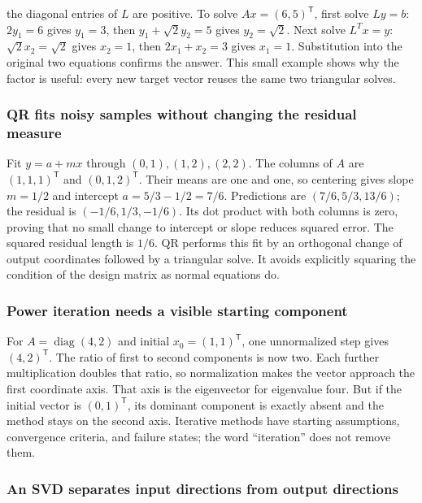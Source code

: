 the diagonal entries of \(L\) are positive. To solve \(Ax=(6,5)^\mathsf T\), first solve \(Ly=b\): \(2y_1=6\) gives \(y_1=3\), then \(y_1+\sqrt2y_2=5\) gives \(y_2=\sqrt2\). Next solve \(L^Tx=y\): \(\sqrt2x_2=\sqrt2\) gives \(x_2=1\), then \(2x_1+x_2=3\) gives \(x_1=1\). Substitution into the original two equations confirms the answer. This small example shows why the factor is useful: every new target vector reuses the same two triangular solves.

\subsubsection{QR fits noisy samples without changing the residual measure}\label{qr-fits-noisy-samples-without-changing-the-residual-measure}

Fit \(y=a+mx\) through \((0,1),(1,2),(2,2)\). The columns of \(A\) are \((1,1,1)^\mathsf T\) and \((0,1,2)^\mathsf T\). Their means are one and one, so centering gives slope \(m=1/2\) and intercept \(a=5/3-1/2=7/6\). Predictions are \((7/6,5/3,13/6)\); the residual is \((-1/6,1/3,-1/6)\). Its dot product with both columns is zero, proving that no small change to intercept or slope reduces squared error. The squared residual length is \(1/6\). QR performs this fit by an orthogonal change of output coordinates followed by a triangular solve. It avoids explicitly squaring the condition of the design matrix as normal equations do.

\subsubsection{Power iteration needs a visible starting component}\label{power-iteration-needs-a-visible-starting-component}

For \(A=\operatorname{diag}(4,2)\) and initial \(x_0=(1,1)^\mathsf T\), one unnormalized step gives \((4,2)^\mathsf T\). The ratio of first to second components is now two. Each further multiplication doubles that ratio, so normalization makes the vector approach the first coordinate axis. That axis is the eigenvector for eigenvalue four. But if the initial vector is \((0,1)^\mathsf T\), its dominant component is exactly absent and the method stays on the second axis. Iterative methods have starting assumptions, convergence criteria, and failure states; the word ``iteration'' does not remove them.

\subsubsection{An SVD separates input directions from output directions}\label{an-svd-separates-input-directions-from-output-directions}

